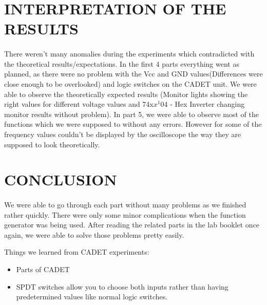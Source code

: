 \documentclass[pdftex,12pt,a4paper]{article}
\begin{document}
\section{INTERPRETATION OF THE RESULTS}
\begin{flushleft}
\paragraph{}
There weren't many anomalies during the experiments which contradicted with the theoretical results/expectations. In the first 4 parts everything went as planned, as there were no problem with the Vcc and GND values(Differences were close enough to be overlooked) and logic switches on the CADET unit. We were able to observe the theoretically expected results (Monitor lights showing the right values for different voltage values and 74x$x^{1}$04 - Hex Inverter changing monitor results without problem). In part 5, we were able to observe most of the functions which we were supposed to without any errors. However for some of the frequency values couldn't be displayed by the oscilloscope the way they are supposed to look theoretically.
\end{flushleft}

\section{CONCLUSION}
\begin{flushleft}
\paragraph{}
We were able to go through each part without many problems as we finished rather quickly. There were only some minor complications when the function generator was being used. After reading the related parts in the lab booklet once again, we were able to solve those problems pretty easily.  
\end{flushleft}

\begin{flushleft}
Things we learned from CADET experiments:
\begin{itemize}
    \item Parts of CADET
    \item SPDT switches allow you to choose both inputs rather than having predetermined values like normal logic switches.
\end{itemize}
\end{flushleft}
\end{document}
